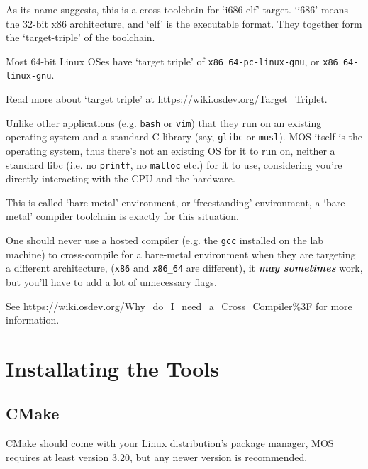 As its name suggests, this is a cross toolchain for `i686-elf' target. `i686' means the 32-bit
x86 architecture, and `elf' is the executable format. They together form the `target-triple' of
the toolchain.

\begin{tip}
    \item Most 64-bit Linux OSes have `target triple' of \texttt{x86\_64-pc-linux-gnu}, or
    \texttt{x86\_64-linux-gnu}.
    \item Read more about `target triple' at \url{https://wiki.osdev.org/Target_Triplet}.
\end{tip}

Unlike other applications (e.g. \texttt{bash} or \texttt{vim}) that they run on an existing
operating system and a standard C library (say, \texttt{glibc} or \texttt{musl}). MOS itself is
the operating system, thus there's not an existing OS for it to run on, neither a standard libc
(i.e. no \texttt{printf}, no \texttt{malloc} etc.) for it to use, considering you're directly
interacting with the CPU and the hardware.

This is called `bare-metal' environment, or `freestanding' environment, a `bare-metal' compiler
toolchain is exactly for this situation.

\begin{warning}
    \item One should never use a hosted compiler (e.g. the \texttt{gcc} installed on the lab machine)
    to cross-compile for a bare-metal environment when they are targeting a different architecture,
    (\texttt{x86} and \texttt{x86\_64} are different), it \textit{\textbf{may sometimes}} work, but
    you'll have to add a lot of unnecessary flags.

    \item See \url{https://wiki.osdev.org/Why_do_I_need_a_Cross_Compiler%3F} for more information.
\end{warning}

\section{Installating the Tools}

\subsection{CMake} \label{sec:cmake-install}

CMake should come with your Linux distribution's package manager, MOS requires at least version
3.20, but any newer version is recommended.

